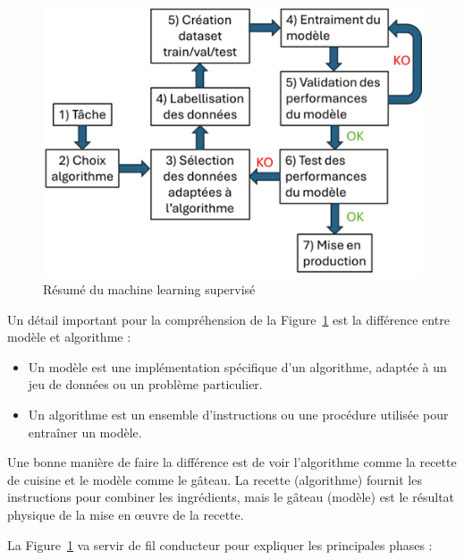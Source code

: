 \begin{figure}[htbp]
    \centering
    \includegraphics[width=1\linewidth]{03-tail/A1_fondamentaux_ML/A1_figures/A1_01_resume_machine_learning_supervise.png}
    \caption{Résumé du machine learning supervisé}
    \label{fig:A1_01_resume_machine_learning_supervise}
\end{figure}


\par{Un détail important pour la compréhension de la Figure~\ref{fig:A1_01_resume_machine_learning_supervise} est la différence entre modèle et algorithme :
\begin{itemize}
    \item Un modèle est une implémentation spécifique d'un algorithme, adaptée à un jeu de données ou un problème particulier.
    \item Un algorithme est un ensemble d'instructions ou une procédure utilisée pour entraîner un modèle.
\end{itemize}
}

\par{Une bonne manière de faire la différence est de voir l'algorithme comme la recette de cuisine et le modèle comme le gâteau. La recette (algorithme) fournit les instructions pour combiner les ingrédients, mais le gâteau (modèle) est le résultat physique de la mise en œuvre de la recette.}

\par{La Figure~\ref{fig:A1_01_resume_machine_learning_supervise} va servir de fil conducteur pour expliquer les principales phases :}

